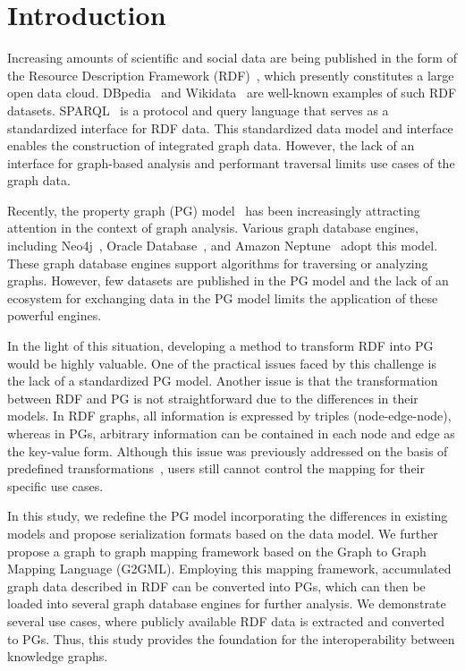\documentclass[runningheads]{llncs}
\begin{document}
\section{Introduction}

Increasing amounts of scientific and social data are being published in the form of the Resource Description Framework (RDF)~\cite{rdf}, which presently constitutes a large open data cloud. DBpedia~\cite{dbpedia} and Wikidata~\cite{wikidata} are well-known examples of such RDF datasets. SPARQL~\cite{sparql} is a protocol and query language that serves as a standardized interface for RDF data. This standardized data model and interface enables the construction of integrated graph data. However, the lack of an interface for graph-based analysis and performant traversal limits use cases of the graph data.

Recently, the property graph (PG) model~\cite{angles1,angles2} has been increasingly attracting attention in the context of graph analysis. Various graph database engines, including Neo4j~\cite{neo4j}, Oracle Database~\cite{oracle}, and Amazon Neptune~\cite{neptune} adopt this model. These graph database engines support algorithms for traversing or analyzing graphs. However, few datasets are published in the PG model and the lack of an ecosystem for exchanging data in the PG model limits the application of these powerful engines.

In the light of this situation, developing a method to transform RDF into PG would be highly valuable. One of the practical issues faced by this challenge is the lack of a standardized PG model.
Another issue is that the transformation between RDF and PG is not straightforward due to the differences in their models. 
In RDF graphs, all information is expressed by triples (node-edge-node), whereas in PGs, arbitrary information can be contained in each node and edge as the key-value form. 
Although this issue was previously addressed on the basis of predefined transformations~\cite{hartig},
users still cannot control the mapping for their specific use cases.

In this study, we redefine the PG model incorporating the differences in existing models and propose serialization formats based on the data model. We further propose a graph to graph mapping framework based on the Graph to Graph Mapping Language (G2GML). Employing this mapping framework, accumulated graph data described in RDF can be converted into PGs, which can then be loaded into several graph database engines for further analysis. We demonstrate several use cases, where publicly available RDF data is extracted and converted to PGs. Thus, this study provides the foundation for the interoperability between knowledge graphs.
\end{document}
